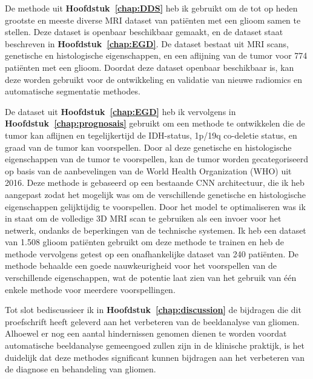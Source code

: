 De methode uit \textbf{Hoofdstuk~\ref{chap:DDS}} heb ik gebruikt om de tot op heden grootste en meeste diverse MRI dataset van pati{\"e}nten met een glioom samen te stellen.
Deze dataset is openbaar beschikbaar gemaakt, en de dataset staat beschreven in \textbf{Hoofdstuk~\ref{chap:EGD}}.
De dataset bestaat uit MRI scans, genetische en histologische eigenschappen, en een aflijning van de tumor voor 774 pati{\"e}nten met een glioom.
Doordat deze dataset openbaar beschikbaar is, kan deze worden gebruikt voor de ontwikkeling en validatie van nieuwe radiomics en automatische segmentatie methodes.

De dataset uit \textbf{Hoofdstuk~\ref{chap:EGD}}  heb ik vervolgens in \textbf{Hoofdstuk~\ref{chap:prognosais}} gebruikt om een methode te ontwikkelen die de tumor kan aflijnen en tegelijkertijd de IDH-status, 1p/19q co-deletie status, en graad van de tumor kan voorspellen.
Door al deze genetische en histologische eigenschappen van de tumor te voorspellen, kan de tumor worden gecategoriseerd op basis van de aanbevelingen van de World Health Organization (WHO) uit 2016.
Deze methode is gebaseerd op een bestaande CNN architectuur, die ik heb aangepast zodat het mogelijk was om de verschillende genetische en histologische eigenschappen gelijktijdig te voorspellen.
Door het model te optimaliseren was ik in staat om de volledige 3D MRI scan te gebruiken als een invoer voor het netwerk, ondanks de beperkingen van de technische systemen.
Ik heb een dataset van 1.508 glioom pati{\"e}nten gebruikt om deze methode te trainen en heb de methode vervolgens getest op een onafhankelijke dataset van 240 pati{\"e}nten.
De methode behaalde een goede nauwkeurigheid voor het voorspellen van de verschillende eigenschappen, wat de potentie laat zien van het gebruik van {\'e}{\'e}n enkele methode voor meerdere voorspellingen.

Tot slot bediscussieer ik in \textbf{Hoofdstuk~\ref{chap:discussion}} de bijdragen die dit proefschrift heeft geleverd aan het verbeteren van de beeldanalyse van gliomen.
Alhoewel er nog een aantal hindernissen genomen dienen te worden voordat automatische beeldanalyse gemeengoed zullen zijn in de klinische praktijk, is het duidelijk dat deze methodes significant kunnen bijdragen aan het verbeteren van de diagnose en behandeling van gliomen.


